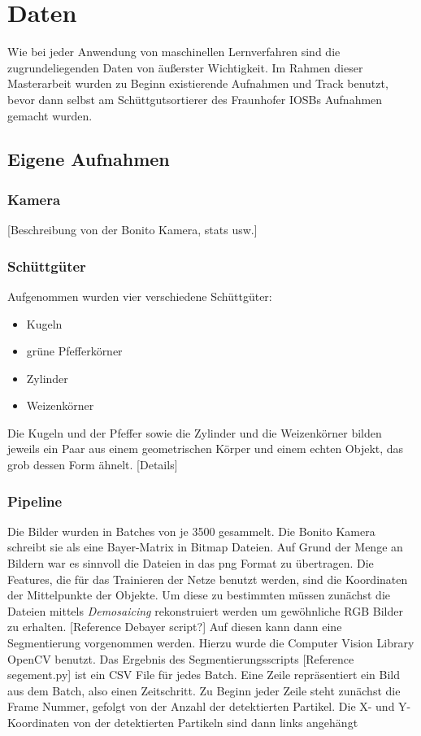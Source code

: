 \chapter{Daten}

Wie bei jeder Anwendung von maschinellen Lernverfahren sind die zugrundeliegenden Daten von äußerster Wichtigkeit.
Im Rahmen dieser Masterarbeit wurden zu Beginn existierende Aufnahmen und Track benutzt, 
bevor dann selbst am Schüttgutsortierer des Fraunhofer IOSBs Aufnahmen gemacht wurden.


\section{Eigene Aufnahmen}

\subsection{Kamera}

[Beschreibung von der Bonito Kamera, stats usw.]

\subsection{Schüttgüter}

Aufgenommen wurden vier verschiedene Schüttgüter:

\begin{itemize}
    \item Kugeln
    \item grüne Pfefferkörner
    \item Zylinder
    \item Weizenkörner
\end{itemize}

Die Kugeln und der Pfeffer sowie die Zylinder und die Weizenkörner bilden jeweils 
ein Paar aus einem geometrischen Körper und einem echten Objekt, das grob dessen Form ähnelt.
[Details]

\subsection{Pipeline}

Die Bilder wurden in Batches von je 3500 gesammelt.
Die Bonito Kamera schreibt sie als eine Bayer-Matrix in Bitmap Dateien.
Auf Grund der Menge an Bildern war es sinnvoll die Dateien in das png Format zu übertragen.
Die Features, die für das Trainieren der Netze benutzt werden, sind die Koordinaten der Mittelpunkte der Objekte.
Um diese zu bestimmten müssen zunächst die Dateien mittels \textit{Demosaicing} rekonstruiert werden um gewöhnliche RGB Bilder zu erhalten.
[Reference Debayer script?]
Auf diesen kann dann eine Segmentierung vorgenommen werden.
Hierzu wurde die Computer Vision Library OpenCV benutzt.
Das Ergebnis des Segmentierungsscripts [Reference segement.py] ist ein CSV File für jedes Batch.
Eine Zeile repräsentiert ein Bild aus dem Batch, also einen Zeitschritt.
Zu Beginn jeder Zeile steht zunächst die Frame Nummer, gefolgt von der Anzahl der detektierten Partikel. 
Die X- und Y-Koordinaten von der detektierten Partikeln sind dann links angehängt

